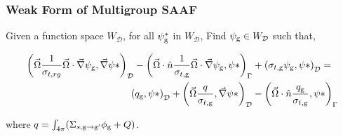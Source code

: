 \subsubsection{Weak Form of Multigroup SAAF}

Given a function space $W_\mathcal{D}$, for all $\psi^*_{\mathrm{g}}$ in $W_\mathcal{D}$, Find $\psi_{\mathrm{g}} \in W_\mathcal{D}$ such that,

\begin{equation}
\begin{split}
        \left ( \vec{\Omega}\frac{1}{\sigma_{t, rg}}\vec{\Omega}\cdot \vec{\nabla}\psi_{\mathrm{g}}, \vec{\nabla}\psi* \right)_\mathcal{D} -     \left ( \vec{\Omega}\cdot \hat{n} \frac{1}{\sigma_{t, \mathrm{g}}}\vec{\Omega} \cdot \vec{\nabla} \psi_{\mathrm{g}},\psi* \right )_{\Gamma} &+ \left ( \sigma_{t, \mathrm{g}} \psi_{\mathrm{g}}, \psi* \right )_\mathcal{D} = \\
        \left ( q_{\mathrm{g}}, \psi* \right)_\mathcal{D} + \left ( \vec{\Omega} \frac{q}{\sigma_{t, \mathrm{g}}}, \vec{\nabla}\psi* \right)_\mathcal{D} &- \left ( \vec{\Omega}\cdot \hat{n} \frac{q_{\mathrm{g}}}{\sigma_{t, \mathrm{g}}}, \psi* \right)_{\Gamma} 
    \end{split}
\end{equation}

where $q = \int_{4\pi}(\Sigma_{s, \mathrm{g} \rightarrow \mathrm{g}'}\phi_{\mathrm{g}} + Q)$.
